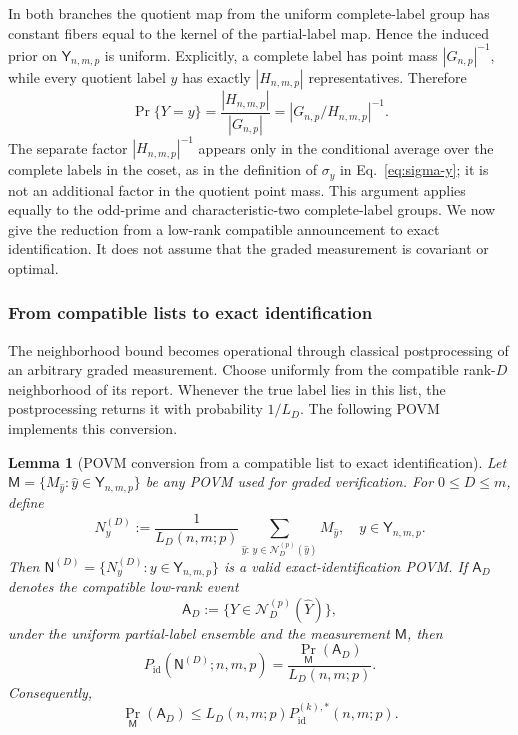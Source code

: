 \documentclass[11pt]{article}
\newcommand{\1}{\mathbf 1}
\theoremstyle{plain}
\newtheorem{lemma}[theorem]{Lemma}
\theoremstyle{definition}
\theoremstyle{remark}
\begin{document}
In both branches the quotient map from the uniform complete-label group has
constant fibers equal to the kernel of the partial-label map.  Hence the
induced prior on $\mathsf Y_{n,m,p}$ is uniform.  Explicitly, a complete label
has point mass $|G_{n,p}|^{-1}$, while every quotient label $y$ has exactly
$|H_{n,m,p}|$ representatives.  Therefore
\begin{equation}
 \Pr\{Y=y\}=\frac{|H_{n,m,p}|}{|G_{n,p}|}
 =|G_{n,p}/H_{n,m,p}|^{-1}.
 \label{eq:uniform-quotient-label-prior}
\end{equation}
The separate factor $|H_{n,m,p}|^{-1}$ appears only in the conditional
average over the complete labels in the coset, as in the definition of
$\sigma_y$ in Eq.~\eqref{eq:sigma-y}; it is not an additional factor in the
quotient point mass.  This argument applies equally to the odd-prime and
characteristic-two complete-label groups.  We now give the reduction from a
low-rank compatible announcement to exact identification.  It does not assume
that the graded measurement is covariant or optimal.

\subsubsection{From compatible lists to exact identification}
\label{subsec:graded-list-to-exact}
\label{subsubsec:list-to-exact-povm-conversion}
The neighborhood bound becomes operational through classical postprocessing
of an arbitrary graded measurement.  Choose uniformly from the compatible
rank-$D$ neighborhood of its report.  Whenever the true label lies in this
list, the postprocessing returns it with probability $1/L_D$.  The following
POVM implements this conversion.

\begin{lemma}[POVM conversion from a compatible list to exact identification]
\label{lem:compatible-list-povm-conversion}
Let
$\mathsf M=\{M_{\widehat y}:\widehat y\in\mathsf Y_{n,m,p}\}$
be any POVM used for graded verification.  For $0\le D\le m$, define
\begin{equation}
 N_y^{(D)}
 :=\frac1{L_D(n,m;p)}
 \sum_{\widehat y:\,y\in\mathcal N_D^{(p)}(\widehat y)}
 M_{\widehat y},
 \quad y\in\mathsf Y_{n,m,p}.
 \label{eq:rank-truncated-exact-povm}
\end{equation}
Then
$\mathsf N^{(D)}=\{N_y^{(D)}:y\in\mathsf Y_{n,m,p}\}$
is a valid exact-identification POVM.  If $\mathsf A_D$ denotes the compatible low-rank event
\begin{equation}
 \mathsf A_D:=\{Y\in\mathcal N_D^{(p)}(\widehat Y)\},
 \label{eq:rank-truncated-event}
\end{equation}
under the uniform partial-label ensemble and the measurement $\mathsf M$,
then
\begin{equation}
 P_{\mathrm{id}}(\mathsf N^{(D)};n,m,p)
 =\frac{\Pr_{\mathsf M}(\mathsf A_D)}{L_D(n,m;p)}.
 \label{eq:rank-truncated-converted-success}
\end{equation}
Consequently,
\begin{equation}
 \Pr_{\mathsf M}(\mathsf A_D)
 \le L_D(n,m;p)
 P_{\mathrm{id}}^{(k),*}(n,m;p).
 \label{eq:rank-truncated-list-event-bound}
\end{equation}
\end{lemma}
\end{document}
